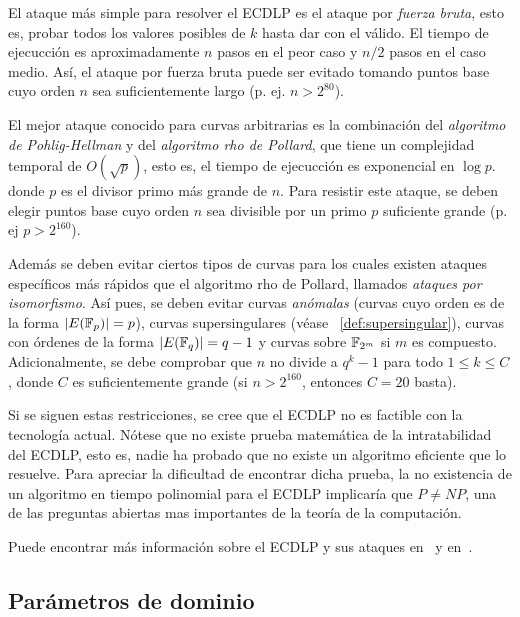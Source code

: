 El ataque más simple para resolver el ECDLP es el ataque por \emph{fuerza bruta}, esto es, probar todos los valores posibles de $k$ hasta dar con el válido. El tiempo de ejecucción es aproximadamente $n$ pasos en el peor caso y $n / 2$ pasos en el caso medio. Así, el ataque por fuerza bruta puede ser evitado tomando puntos base cuyo orden $n$ sea suficientemente largo (p. ej. $n > 2^{80}$).

El mejor ataque conocido para curvas arbitrarias es la combinación del \emph{algoritmo de Pohlig-Hellman} y del \emph{algoritmo rho de Pollard}, que tiene un complejidad temporal de $O(\sqrt{p})$, esto es, el tiempo de ejecucción es exponencial en $\log{p}$. donde $p$ es el divisor primo más grande de $n$. Para resistir este ataque, se deben elegir puntos base cuyo orden $n$ sea divisible por un primo $p$ suficiente grande (p. ej $p > 2^{160}$).

Además se deben evitar ciertos tipos de curvas para los cuales existen ataques específicos más rápidos que el algoritmo rho de Pollard, llamados \emph{ataques por isomorfismo}. Así pues, se deben evitar curvas \emph{anómalas} (curvas cuyo orden es de la forma $|E(\mathbb{F}_p)| = p$), curvas supersingulares (véase ~\ref{def:supersingular}), curvas con órdenes de la forma $|E(\mathbb{F}_q)| = q - 1$ y curvas sobre $\mathbb{F}_{2^m}$ si $m$ es compuesto. Adicionalmente, se debe comprobar que $n$ no divide a $q^k - 1$ para todo $1 \le k \le C$, donde $C$ es suficientemente grande (si $n > 2^{160}$, entonces $C = 20$ basta).

Si se siguen estas restricciones, se cree que el ECDLP no es factible con la tecnología actual. Nótese que no existe prueba matemática de la intratabilidad del ECDLP, esto es, nadie ha probado que no existe un algoritmo eficiente que lo resuelve. Para apreciar la dificultad de encontrar dicha prueba, la no existencia de un algoritmo en tiempo polinomial para el ECDLP implicaría que $P \neq NP$, una de las preguntas abiertas mas importantes de la teoría de la computación.

Puede encontrar más información sobre el ECDLP y sus ataques en~\cite[cap. 4]{Hankerson:2003} y en~\cite[cap. 4]{Washington:2008}.

\subsection{Parámetros de dominio}
\label{sub:Parámetros de dominio}

